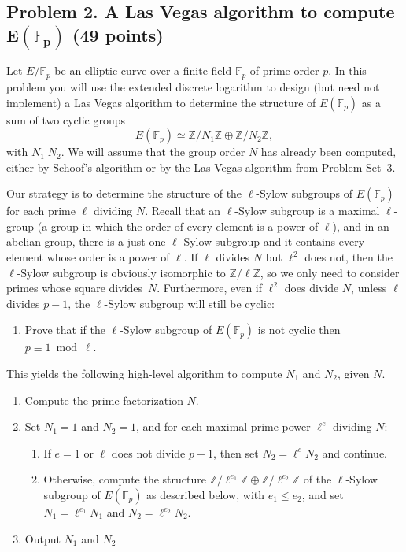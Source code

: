 \documentclass[11pt]{article}
\newcommand{\Fp}{\mathbb{F}_p}
\newcommand{\Z}{\mathbb{Z}}
\theoremstyle{definition}
\begin{document}
\subsection*{Problem 2. A Las Vegas algorithm to compute $\boldsymbol{E(\Fp)}$ (49 points)}

Let $E/\Fp$ be an elliptic curve over a finite field $\Fp$ of prime order $p$.
In this problem you will use the extended discrete logarithm to design (but need not implement) a Las Vegas algorithm to determine the structure of $E(\Fp)$ as a sum of two cyclic groups
\[
E(\Fp)\simeq \Z/N_1\Z\oplus\Z/N_2\Z,
\]
with $N_1|N_2$.
We will assume that the group order $N$ has already been computed, either by Schoof's algorithm or by the Las Vegas algorithm from Problem Set~3.

Our strategy is to determine the structure of the $\ell$-Sylow subgroups of $E(\Fp)$ for each prime $\ell$ dividing $N$.
Recall that an $\ell$-Sylow subgroup is a maximal $\ell$-group (a group in which the order of every element is a power of $\ell$), and in an abelian group, there is a just one $\ell$-Sylow subgroup and it contains every element whose order is a power of $\ell$.
If $\ell$ divides $N$ but $\ell^2$ does not, then the $\ell$-Sylow subgroup is obviously isomorphic to $\Z/\ell\Z$, so we only need to consider primes whose square divides~$N$.
Furthermore, even if $\ell^2$ does divide $N$, unless $\ell$ divides $p-1$, the $\ell$-Sylow subgroup will still be cyclic:
\begin{enumerate}[{\bf (a)}]
\item Prove that if the $\ell$-Sylow subgroup of $E(\Fp)$ is not cyclic then $p\equiv 1\bmod \ell$.
\end{enumerate}

\noindent
This yields the following high-level algorithm to compute $N_1$ and $N_2$, given $N$.
\begin{enumerate}
\item Compute the prime factorization $N$.
\item Set $N_1=1$ and $N_2=1$, and for each maximal prime power $\ell^e$ dividing $N$:
\begin{enumerate}
\item If $e=1$ or $\ell$ does not divide $p-1$, then set $N_2=\ell^eN_2$ and continue.
\item Otherwise, compute the structure $\Z/\ell^{e_1}\Z\oplus\Z/\ell^{e_2}\Z$ of the $\ell$-Sylow subgroup of $E(\Fp)$ as described below, with $e_1\le e_2$,
and set $N_1=\ell^{e_1}N_1$ and $N_2=\ell^{e_2}N_2$.
\end{enumerate}
\item Output $N_1$ and $N_2$
\end{enumerate}
\end{document}
